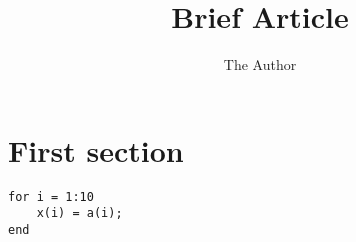\documentclass[11pt]{article}
\title{Brief Article}
\author{The Author}
\begin{document}
\maketitle

\section{First section}

\begin{verbatim}
for i = 1:10
	x(i) = a(i);
end
\end{verbatim}
\end{document}
